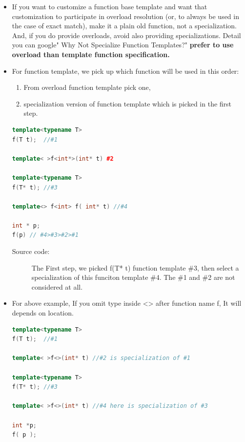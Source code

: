\documentclass[a4paper,11pt,twoside]{book}
\begin{document}
\begin{itemize}
	\item  If you want to customize a function base template and want that customization to participate in overload resolution (or, to always be used in the case of exact match), make it a plain old function, not a specialization. And, if you do provide overloads, avoid also providing specializations. Detail you can google" Why Not Specialize Function Templates?" \textbf{prefer to use overload than template function specification.}

	\item For function template, we pick up which function will be used in this order: 
	\begin{enumerate}
		\item From overload function template pick one,
		\item specialization version of function template which is picked in the first step.
	\end{enumerate}

\begin{lstlisting}[frame=single, language=c++]
template<typename T>
f(T t);  //#1

template< >f<int*>(int* t) #2

template<typename T>
f(T* t); //#3

template<> f<int> f( int* t) //#4

int * p;
f(p) // #4>#3>#2>#1
\end{lstlisting}
\begin{description}
	\item[Source code:] The First step, we picked f(T* t) function template \#3, then select a specialization of this funciton template \#4. The \#1 and \#2 are not considered at all.
\end{description}

\item For above example, If you omit type inside <> after function name f, It will depends on location.
\begin{lstlisting}[frame=single, language=c++]
template<typename T>
f(T t);  //#1

template< >f<>(int* t) //#2 is specialization of #1

template<typename T>
f(T* t); //#3

template< >f<>(int* t) //#4 here is specialization of #3

int *p; 
f( p ); 
\end{lstlisting}
\begin{description}
	

\end{description}
\end{itemize}
\end{document}
